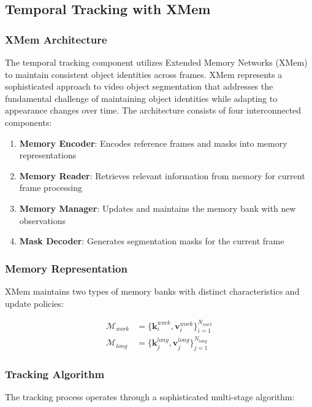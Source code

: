 \documentclass[12pt]{article}
\begin{document}
\subsection{Temporal Tracking with XMem}

\subsubsection{XMem Architecture}

The temporal tracking component utilizes Extended Memory Networks (XMem) to maintain consistent object identities across frames. XMem represents a sophisticated approach to video object segmentation that addresses the fundamental challenge of maintaining object identities while adapting to appearance changes over time. The architecture consists of four interconnected components:

\begin{enumerate}
  \item \textbf{Memory Encoder}: Encodes reference frames and masks into memory representations
  \item \textbf{Memory Reader}: Retrieves relevant information from memory for current frame processing
  \item \textbf{Memory Manager}: Updates and maintains the memory bank with new observations
  \item \textbf{Mask Decoder}: Generates segmentation masks for the current frame
\end{enumerate}

\subsubsection{Memory Representation}

XMem maintains two types of memory banks with distinct characteristics and update policies:

\begin{align}
  \mathcal{M}_{work} & = \{\mathbf{k}_i^{work}, \mathbf{v}_i^{work}\}_{i=1}^{N_{work}} \\
  \mathcal{M}_{long} & = \{\mathbf{k}_j^{long}, \mathbf{v}_j^{long}\}_{j=1}^{N_{long}}
\end{align}

\subsubsection{Tracking Algorithm}

The tracking process operates through a sophisticated multi-stage algorithm:
\end{document}
